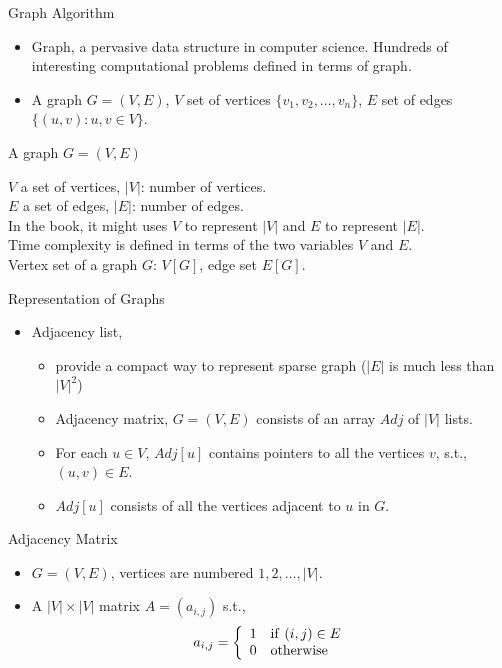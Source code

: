\documentclass{beamer}
\begin{document}
\begin{frame}{}

\centerline{\Large  Graph Algorithm}
\begin{itemize}
\item Graph, a pervasive data structure in computer science. Hundreds of interesting computational
 problems defined in terms of graph.
\item A graph $G=(V,E)$, $V$ set of vertices $\{v_1,v_2,\ldots,v_n\}$, 
 $E$ set of edges $\{(u,v):u,v\in V\}$.
\end{itemize}
\end{frame}

\begin{frame}{}

\centerline{\large A graph $G=(V,E)$}
$V$ a set of vertices, $|V|$: number of vertices. \\
$E$ a set of edges, $|E|$: number of edges.\\
In the book, it might uses $V$ to represent $|V|$ and $E$ to represent $|E|$. \\
Time complexity is defined in terms of the two variables $V$ and $E$. \\
Vertex set of a graph $G$: $V[G]$, edge set $E[G]$.  
\end{frame}

\begin{frame}{}

\centerline{\large Representation of Graphs}
\begin{small}
\begin{itemize}
\item Adjacency list,
\begin{itemize}
\item  provide a compact way to represent sparse graph ($|E|$ is much
 less than $|V|^2$)
\item Adjacency matrix, $G=(V,E)$ consists of an array $Adj$ of $|V|$ lists.
\item For each $u\in V$, $Adj[u]$ contains pointers to all the
 vertices $v$, s.t.,
  $(u,v)\in E$.  
\item $Adj[u]$ consists of all the vertices adjacent to $u$ in
 $G$.  
\end{itemize}
\end{itemize}
\end{small}
\end{frame}

\begin{frame}{}

\centerline{Adjacency Matrix}
\begin{itemize}
\item $G=(V,E)$, vertices are numbered $1, 2, \ldots, |V|$.  
\item A $|V|\times |V|$ matrix $A=(a_{i,j})$ s.t., 
$$
a_{i,j} = \left \{
\begin{array}{ll}
1 & {\rm if\ } (i,j) \in E \\
0 & {\rm otherwise}
\end{array}
\right.
$$
\end{itemize}
\end{frame}
\end{document}

